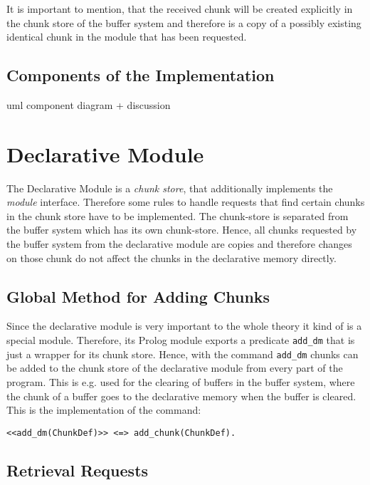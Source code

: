 It is important to mention, that the received chunk will be created explicitly in the chunk store of the buffer system and therefore is a copy of a possibly existing identical chunk in the module that has been requested.

\subsection{Components of the Implementation}

uml component diagram + discussion



\section{Declarative Module}

The Declarative Module is a \emph{chunk store}, that additionally implements the \emph{module} interface. Therefore some rules to handle requests that find certain chunks in the chunk store have to be implemented. The chunk-store is separated from the buffer system which has its own chunk-store. Hence, all chunks requested by the buffer system from the declarative module are copies and therefore changes on those chunk do not affect the chunks in the declarative memory directly.

\subsection{Global Method for Adding Chunks}
\label{global_method_for_adding_chunks}

Since the declarative module is very important to the whole theory it kind of is a special module. Therefore, its Prolog module exports a predicate \lstinline|add_dm| that is just a wrapper for its chunk store. Hence, with the command \lstinline|add_dm| chunks can be added to the chunk store of the declarative module from every part of the program. This is e.g. used for the clearing of buffers in the buffer system, where the chunk of a buffer goes to the declarative memory when the buffer is cleared. This is the implementation of the command:

\begin{lstlisting}
<<add_dm(ChunkDef)>> <=> add_chunk(ChunkDef).
\end{lstlisting}

\subsection{Retrieval Requests}
\label{retrieval_requests}

